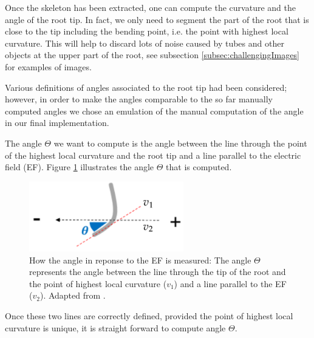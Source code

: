 Once the skeleton has been extracted, one can compute the curvature and the angle of the root tip. 
In fact, we only need to segment the part of the root that is close to the tip including the bending point, i.e. the point with highest local curvature. %
This will help to discard lots of noise caused by tubes and other objects at the upper part of the root, see subsection \ref{subsec:challengingImages} for examples of images.

Various definitions of angles associated to the root tip had been considered; however, in order to make the angles comparable to the so far manually computed angles we chose an emulation of the manual computation of the angle in our final implementation. 



The angle \(\Theta\) we want to compute is the angle between the line through the point of the highest local %
curvature and the root tip and a line parallel to the electric field (EF).  
Figure \ref{fig:angle} illustrates the angle \(\Theta\) that is computed. 


\begin{figure}[H]
	\centering
	\includegraphics[width=0.6\textwidth]{../Figures/angle2.png}
	\caption{How the angle in reponse to the EF is measured: The angle \( \Theta \) represents the angle between the line through the tip of the root and the point of highest local curvature (\( v_{1}\)) and a line parallel to the EF (\( v_{2} \)).
	Adapted from \cite{GExpCircuit}.}
	\label{fig:angle}
\end{figure}

Once these two lines are correctly defined, provided the point of highest local curvature is unique, it is straight forward to compute angle \(\Theta\).

